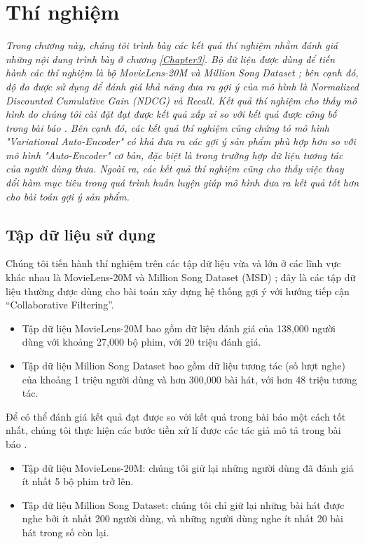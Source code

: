 \chapter{Thí nghiệm}
\label{Chapter4}
\graphicspath{{Chapter4/Chapter4Figs}}
\textit{Trong chương này, chúng tôi trình bày các kết quả thí nghiệm nhằm đánh giá những nội dung trình bày ở chương \ref{Chapter3}. Bộ dữ liệu được dùng để tiến hành các thí nghiệm là bộ MovieLens-20M \cite{Ml20M} và Million Song Dataset \cite{MSD}; bên cạnh đó, độ đo được sử dụng để đánh giá khả năng đưa ra gợi ý của mô hình là Normalized Discounted Cumulative Gain (NDCG) và  Recall. Kết quả thí nghiệm cho thấy mô hình do chúng tôi cài đặt đạt được kết quả xấp xỉ so với kết quả được công bố trong bài báo \cite{mvae}. Bên cạnh đó, các kết quả thí nghiệm cũng chứng tỏ mô hình "Variational Auto-Encoder" có khả đưa ra các gợi ý sản phẩm phù hợp hơn so với mô hình "Auto-Encoder" cơ bản, đặc biệt là trong trường hợp dữ liệu tương tác của người dùng thưa. Ngoài ra, các kết quả thí nghiệm cũng cho thấy việc thay đổi hàm mục tiêu trong quá trình huấn luyện giúp mô hình đưa ra kết quả tốt hơn cho bài toán gợi ý sản phẩm.}


\section{Tập dữ liệu sử dụng}
\label{chap4sec1}
Chúng tôi tiến hành thí nghiệm trên các tập dữ liệu vừa và lớn ở các lĩnh vực khác nhau là MovieLens-20M \cite{Ml20M} 
và Million Song Dataset (MSD) \cite{MSD}; đây là các tập dữ liệu thường được dùng cho bài toán xây dựng hệ thống gợi ý
với hướng tiếp cận ``Collaborative Filtering''. 
\begin{itemize}
    \item Tập dữ liệu MovieLens-20M bao gồm dữ liệu đánh giá của 138,000 người dùng với khoảng 27,000 bộ phim,
    với 20 triệu đánh giá.
    \item Tập dữ liệu Million Song Dataset bao gồm dữ liệu tương tác (số lượt nghe) của khoảng 1 triệu người dùng và hơn 300,000 bài hát, với hơn 48 triệu tương tác.
\end{itemize}

Để có thể đánh giá kết quả đạt được so với kết quả trong bài báo \cite{mvae} một cách tốt nhất,
chúng tôi thực hiện các bước tiền xử lí được các tác giả mô tả trong bài báo \cite{mvae}.
\begin{itemize}
    \item Tập dữ liệu MovieLens-20M: chúng tôi giữ lại những người dùng đã đánh giá ít nhất 5 bộ phim trở lên. 
    \item Tập dữ liệu Million Song Dataset: chúng tôi chỉ giữ lại những bài hát được nghe bởi ít nhất 200 người dùng, và những người dùng nghe ít nhất 20 bài hát trong số còn lại.
\end{itemize}

